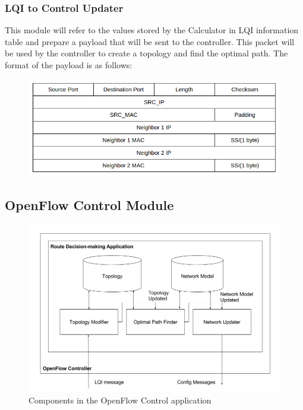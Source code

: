 \documentclass{article}
\begin{document}
\subsubsection{LQI to Control Updater} 
This module will refer to the values stored by the Calculator in LQI information table and prepare a payload that will
be sent to the controller. This packet will be used by the controller to create a topology and find the optimal path.
The format of the payload is as follows:
\begin{figure}[H]
\centering
\includegraphics[width=\textwidth]{lqi_to_control_updater}
\end{figure}
\subsection{OpenFlow Control Module}
\begin{figure}[H]
\caption{Components in the OpenFlow Control application}
\centering
\includegraphics[width=\textwidth]{openflow}
\end{figure}
\end{document}
